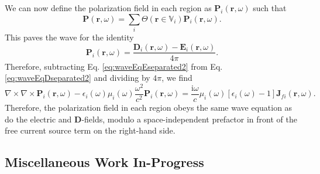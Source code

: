 \documentclass{article}
\begin{document}
We can now define the polarization field in each region as $\mathbf{P}_i(\mathbf{r},\omega)$ such that
\begin{equation}
\mathbf{P}(\mathbf{r},\omega) = \sum_i\Theta(\mathbf{r}\in\mathbb{V}_i)\mathbf{P}_i(\mathbf{r},\omega).
\end{equation}
This paves the wave for the identity
\begin{equation}
\mathbf{P}_i(\mathbf{r},\omega) = \frac{\mathbf{D}_i(\mathbf{r},\omega) - \mathbf{E}_i(\mathbf{r},\omega)}{4\pi}.
\end{equation}
Therefore, subtracting Eq. \eqref{eq:waveEqEseparated2} from Eq. \eqref{eq:waveEqDseparated2} and dividing by $4\pi$, we find
\begin{equation}
\nabla\times\nabla\times\mathbf{P}_i(\mathbf{r},\omega) - \epsilon_i(\omega)\mu_i(\omega)\frac{\omega^2}{c^2}\mathbf{P}_i(\mathbf{r},\omega) = \frac{\mathrm{i}\omega}{c}\mu_i(\omega)\left[\epsilon_i(\omega) - 1\right]\mathbf{J}_{fi}(\mathbf{r},\omega).
\end{equation}
Therefore, the polarization field in each region obeys the same wave equation as do the electric and $\mathbf{D}$-fields, modulo a space-independent prefactor in front of the free current source term on the right-hand side.














\subsection{Miscellaneous Work In-Progress}








\newpage





\end{document}
